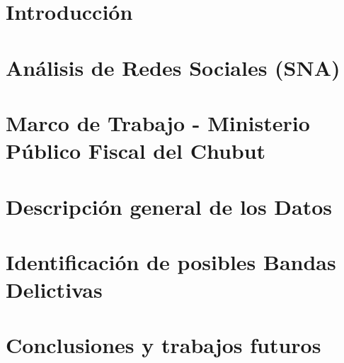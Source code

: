 \documentclass[runningheads]{llncs}
\begin{document}
%

\maketitle              %

%

%
\section{Introducción}



\section{Análisis de Redes Sociales (SNA)}


\section{Marco de Trabajo - Ministerio Público Fiscal del Chubut}


\section{Descripción general de los Datos}


\section{Identificación de posibles Bandas Delictivas}


\section{Conclusiones y trabajos futuros}



\end{document}
